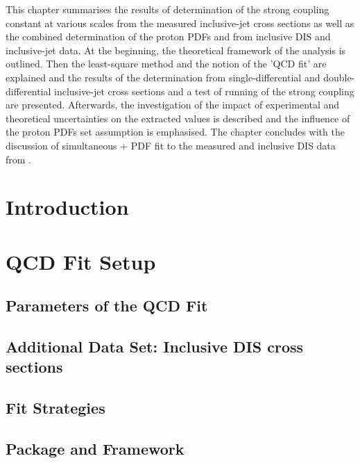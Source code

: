 This chapter summarises the results of determination of the strong coupling constant at various scales from the measured inclusive-jet cross sections as well as the combined determination of the proton PDFs and \asz from inclusive DIS and inclusive-jet data. At the beginning, the theoretical framework of the analysis is outlined. Then the least-square method and the notion of the 'QCD fit' are explained and the results of the \asz determination from single-differential and double-differential inclusive-jet cross sections and a test of running of the strong coupling are presented. Afterwards, the investigation of the impact of experimental and theoretical uncertainties on the extracted \asz values is described and the influence of the proton PDFs set assumption is emphasised. The chapter concludes with the discussion of simultaneous \as + PDF fit to the measured and inclusive DIS data from \hera.

\section{Introduction}
\label{sec:qcdfitintro}


\section{QCD Fit Setup}
\label{sec:fitsettings}


\subsection{Parameters of the QCD Fit}
\label{subsec:qcdfitparams}


\subsection{Additional Data Set: Inclusive DIS cross sections}
\label{subsec:inclusivedisdata}


\subsection{Fit Strategies}
\label{subsec:fitstategy}


\subsection{\herafitter Package and \fastnlo Framework}
\label{subsec:herfitter}


